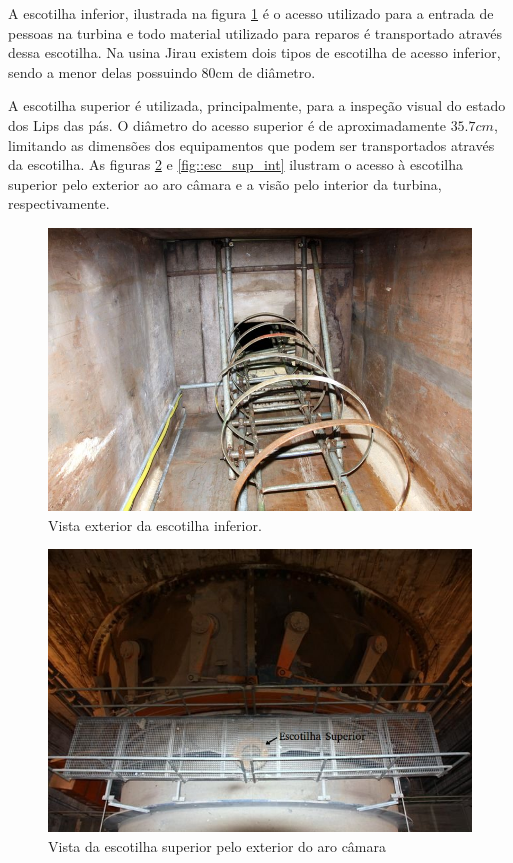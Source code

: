 A escotilha inferior, ilustrada na figura \ref{fig::esc_inf} é o acesso
utilizado para a entrada de pessoas na turbina e todo material utilizado para reparos é transportado através dessa escotilha. Na usina Jirau existem dois 
tipos de escotilha de acesso inferior, sendo a menor delas possuindo 80cm de diâmetro. 

A escotilha superior é utilizada, principalmente, para a inspeção visual do
estado dos Lips das pás.
O diâmetro do acesso superior é de aproximadamente $35.7cm$, limitando as
dimensões dos equipamentos que podem ser transportados através da escotilha. As figuras \ref{fig::esc_sup_ext} e
\ref{fig::esc_sup_int} ilustram o acesso à escotilha superior pelo exterior ao
aro câmara e a visão pelo interior da turbina,
respectivamente.

\begin{figure}[h!]	
	\centering
	\includegraphics[width=0.8\columnwidth]{figs/esc_inf}
	\caption{Vista exterior da escotilha inferior.}
	\label{fig::esc_inf}
\end{figure}




\begin{figure}[h!]	
	\centering
	\includegraphics[width=0.8\columnwidth]{sota/figs/viagem/img_4979_mod}
	\caption{Vista da escotilha superior pelo exterior do aro câmara}
	\label{fig::esc_sup_ext}
\end{figure}

